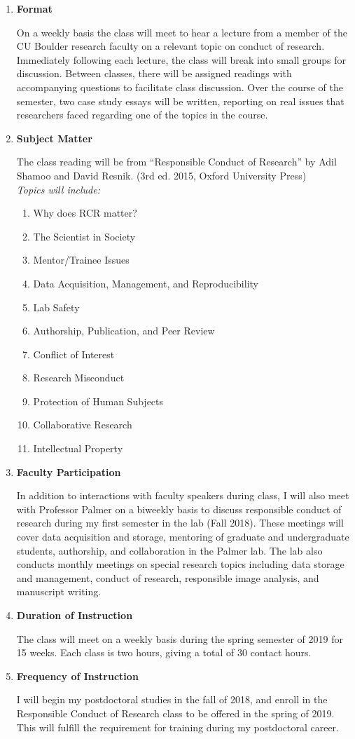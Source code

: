 \begin{enumerate}
  \item{\bf Format}

  On a weekly basis the class will meet to hear a lecture from a member of the CU Boulder research faculty on a relevant topic on conduct of research. Immediately following each lecture, the class will break into small groups for discussion. Between classes, there will be assigned readings with accompanying questions to facilitate class discussion. Over the course of the semester, two case study essays will be written, reporting on real issues that researchers faced regarding one of the topics in the course.
  \item{\bf Subject Matter}

  The class reading will be from ``Responsible Conduct of Research'' by Adil Shamoo and David Resnik. (3rd ed. 2015, Oxford University Press)\\

  \textit{Topics will include:}
  \begin{enumerate}
  \item{Why does RCR matter?}
  \item{The Scientist in Society}
  \item{Mentor/Trainee Issues}
  \item{Data Acquisition, Management, and Reproducibility}
  \item{Lab Safety}
  \item{Authorship, Publication, and Peer Review}
  \item{Conflict of Interest}
  \item{Research Misconduct}
  \item{Protection of Human Subjects}
  \item{Collaborative Research}
  \item{Intellectual Property}
  \end{enumerate}
  \item{\bf Faculty Participation}

  In addition to interactions with faculty speakers during class, I will also meet with Professor Palmer on a biweekly basis to discuss responsible conduct of research during my first semester in the lab (Fall 2018). These meetings will cover data acquisition and storage, mentoring of graduate and undergraduate students, authorship, and collaboration in the Palmer lab. The lab also conducts monthly meetings on special research topics including data storage and management, conduct of research, responsible image analysis, and manuscript writing.
  \item{\bf Duration of Instruction}

  The class will meet on a weekly basis during the spring semester of 2019 for 15 weeks. Each class is two hours, giving a total of 30 contact hours.
  \item{\bf Frequency of Instruction}

  I will begin my postdoctoral studies in the fall of 2018, and enroll in the Responsible Conduct of Research class to be offered in the spring of 2019. This will fulfill the requirement for training during my postdoctoral career.
\end{enumerate}

